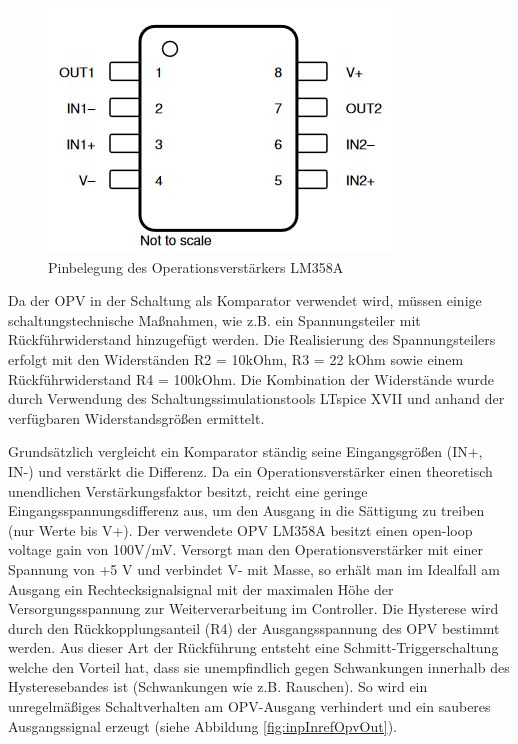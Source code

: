 \begin{figure}[H] %
\includegraphics[width=.50\textwidth]{sec4/images/OPV_Pinbelegung} 
\centering
\captionsetup{width=.95\textwidth}
\caption[Pinbelegung des Operationsverstärkers LM358A]{Pinbelegung des Operationsverstärkers LM358A}\centering
\label{fig:OPVPinbelegung}
\end{figure}


Da der \ac{OPV} in der Schaltung als Komparator verwendet wird, müssen einige schaltungstechnische Maßnahmen, wie z.B. ein Spannungsteiler mit Rückführwiderstand hinzugefügt werden. Die Realisierung des Spannungsteilers erfolgt mit den Widerständen R2 = 10kOhm, R3 = 22 kOhm sowie einem Rückführwiderstand R4 = 100kOhm. Die Kombination der Widerstände wurde durch Verwendung des Schaltungssimulationstools LTspice XVII und anhand der verfügbaren Widerstandsgrößen ermittelt.\vspace{11pt}

Grundsätzlich vergleicht ein Komparator ständig seine Eingangsgrößen (IN+, IN-) und verstärkt die Differenz. Da ein Operationsverstärker einen theoretisch unendlichen Verstärkungsfaktor besitzt, reicht eine geringe Eingangsspannungsdifferenz aus, um den Ausgang in die Sättigung zu treiben (nur Werte bis V+). Der verwendete OPV LM358A besitzt einen \glqq{}open-loop voltage gain\grqq{} von 100V/mV. Versorgt man den Operationsverstärker mit einer Spannung von +5 V und verbindet V- mit Masse, so erhält man im Idealfall am Ausgang ein Rechtecksignalsignal mit der maximalen Höhe der Versorgungsspannung zur Weiterverarbeitung im Controller. Die Hysterese wird durch den Rückkopplungsanteil (R4) der Ausgangsspannung des \ac{OPV} bestimmt werden. Aus dieser Art der Rückführung entsteht eine Schmitt-Triggerschaltung welche den Vorteil hat, dass sie unempfindlich gegen Schwankungen innerhalb des Hysteresebandes ist (Schwankungen wie z.B. Rauschen). So wird ein unregelmäßiges Schaltverhalten am \ac{OPV}-Ausgang verhindert und ein sauberes Ausgangssignal erzeugt (siehe Abbildung \ref{fig:inpInrefOpvOut}).\vspace{11pt}

